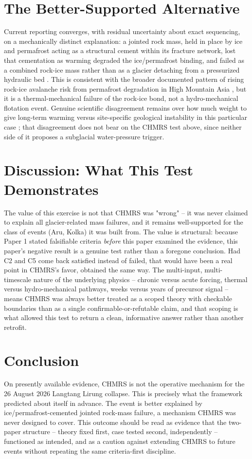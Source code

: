 \documentclass[11pt,twocolumn]{article}
\begin{document}
\section{The Better-Supported Alternative}
Current reporting converges, with residual uncertainty about exact sequencing, on a mechanically distinct explanation: a jointed rock mass, held in place by ice and permafrost acting as a structural cement within its fracture network, lost that cementation as warming degraded the ice/permafrost binding, and failed as a combined rock-ice mass rather than as a glacier detaching from a pressurized hydraulic bed \cite{geoscopy2026,pielke2026}. This is consistent with the broader documented pattern of rising rock-ice avalanche risk from permafrost degradation in High Mountain Asia \cite{conversation2026}, but it is a thermal-mechanical failure of the rock-ice bond, not a hydro-mechanical flotation event. Genuine scientific disagreement remains over how much weight to give long-term warming versus site-specific geological instability in this particular case \cite{pielke2026}; that disagreement does not bear on the CHMRS test above, since neither side of it proposes a subglacial water-pressure trigger.

\section{Discussion: What This Test Demonstrates}
The value of this exercise is not that CHMRS was "wrong" -- it was never claimed to explain all glacier-related mass failures, and it remains well-supported for the class of events (Aru, Kolka) it was built from. The value is structural: because Paper 1 stated falsifiable criteria \emph{before} this paper examined the evidence, this paper's negative result is a genuine test rather than a foregone conclusion. Had C2 and C5 come back satisfied instead of failed, that would have been a real point in CHMRS's favor, obtained the same way. The multi-input, multi-timescale nature of the underlying physics -- chronic versus acute forcing, thermal versus hydro-mechanical pathways, weeks versus years of precursor signal -- means CHMRS was always better treated as a scoped theory with checkable boundaries than as a single confirmable-or-refutable claim, and that scoping is what allowed this test to return a clean, informative answer rather than another retrofit.

\section{Conclusion}
On presently available evidence, CHMRS is not the operative mechanism for the 26 August 2026 Langtang Lirung collapse. This is precisely what the framework predicted about itself in advance. The event is better explained by ice/permafrost-cemented jointed rock-mass failure, a mechanism CHMRS was never designed to cover. This outcome should be read as evidence that the two-paper structure -- theory fixed first, case tested second, independently -- functioned as intended, and as a caution against extending CHMRS to future events without repeating the same criteria-first discipline.
\end{document}
